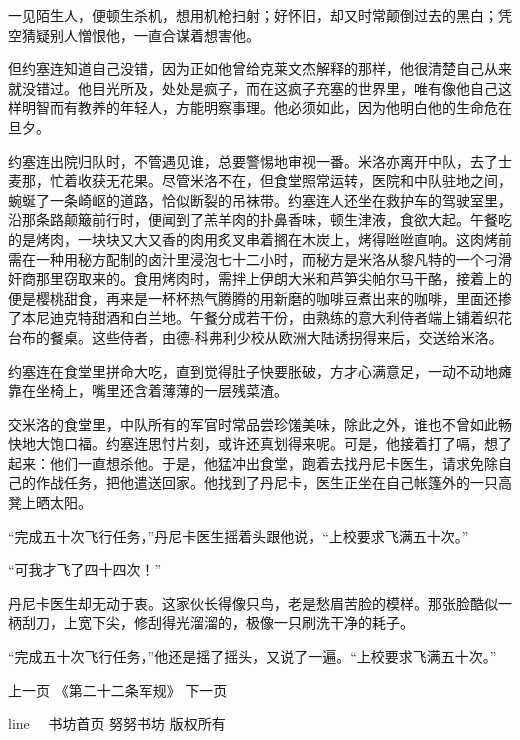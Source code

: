     一见陌生人，便顿生杀机，想用机枪扫射；好怀旧，却又时常颠倒过去的黑白；凭空猜疑别人憎恨他，一直合谋着想害他。
 


    但约塞连知道自己没错，因为正如他曾给克莱文杰解释的那样，他很清楚自己从来就没错过。他目光所及，处处是疯子，而在这疯子充塞的世界里，唯有像他自己这样明智而有教养的年轻人，方能明察事理。他必须如此，因为他明白他的生命危在旦夕。

    约塞连出院归队时，不管遇见谁，总要警惕地审视一番。米洛亦离开中队，去了士麦那，忙着收获无花果。尽管米洛不在，但食堂照常运转，医院和中队驻地之间，蜿蜒了一条崎岖的道路，恰似断裂的吊袜带。约塞连人还坐在救护车的驾驶室里，沿那条路颠簸前行时，便闻到了羔羊肉的扑鼻香味，顿生津液，食欲大起。午餐吃的是烤肉，一块块又大又香的肉用炙叉串着搁在木炭上，烤得咝咝直响。这肉烤前需在一种用秘方配制的卤汁里浸泡七十二小时，而秘方是米洛从黎凡特的一个刁滑奸商那里窃取来的。食用烤肉时，需拌上伊朗大米和芦笋尖帕尔马干酪，接着上的便是樱桃甜食，再来是一杯杯热气腾腾的用新磨的咖啡豆煮出来的咖啡，里面还掺了本尼迪克特甜酒和白兰地。午餐分成若干份，由熟练的意大利侍者端上铺着织花台布的餐桌。这些侍者，由德-科弗利少校从欧洲大陆诱拐得来后，交送给米洛。

    约塞连在食堂里拼命大吃，直到觉得肚子快要胀破，方才心满意足，一动不动地瘫靠在坐椅上，嘴里还含着薄薄的一层残菜渣。

    交米洛的食堂里，中队所有的军官时常品尝珍馐美味，除此之外，谁也不曾如此畅快地大饱口福。约塞连思忖片刻，或许还真划得来呢。可是，他接着打了嗝，想了起来：他们一直想杀他。于是，他猛冲出食堂，跑着去找丹尼卡医生，请求免除自己的作战任务，把他遣送回家。他找到了丹尼卡，医生正坐在自己帐篷外的一只高凳上晒太阳。

    “完成五十次飞行任务，”丹尼卡医生摇着头跟他说，“上校要求飞满五十次。”

    “可我才飞了四十四次！”

    丹尼卡医生却无动于衷。这家伙长得像只鸟，老是愁眉苦脸的模样。那张脸酷似一柄刮刀，上宽下尖，修刮得光溜溜的，极像一只刷洗干净的耗子。

    “完成五十次飞行任务，”他还是摇了摇头，又说了一遍。“上校要求飞满五十次。”

 
上一页	《第二十二条军规》	下一页
 
line
 　书坊首页	努努书坊 版权所有

